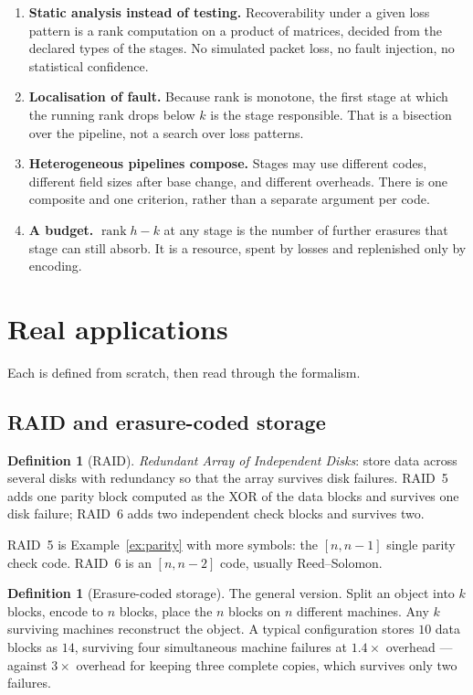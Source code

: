 \documentclass[11pt,a4paper]{article}
\theoremstyle{definition}
\newtheorem{definition}[theorem]{Definition}
\theoremstyle{remark}
\DeclareMathOperator{\rank}{rank}
\begin{document}
\begin{enumerate}[nosep]
  \item \textbf{Static analysis instead of testing.} Recoverability under a given loss
        pattern is a rank computation on a product of matrices, decided from the
        declared types of the stages. No simulated packet loss, no fault injection,
        no statistical confidence.
  \item \textbf{Localisation of fault.} Because rank is monotone, the first stage at
        which the running rank drops below $k$ is the stage responsible. That is a
        bisection over the pipeline, not a search over loss patterns.
  \item \textbf{Heterogeneous pipelines compose.} Stages may use different codes,
        different field sizes after base change, and different overheads. There is one
        composite and one criterion, rather than a separate argument per code.
  \item \textbf{A budget.} $\rank h - k$ at any stage is the number of further
        erasures that stage can still absorb. It is a resource, spent by losses and
        replenished only by encoding.
\end{enumerate}

\section{Real applications}

Each is defined from scratch, then read through the formalism.

\subsection{RAID and erasure-coded storage}

\begin{definition}[RAID]
\emph{Redundant Array of Independent Disks}: store data across several disks with
redundancy so that the array survives disk failures. RAID~5 adds one parity block
computed as the XOR of the data blocks and survives one disk failure; RAID~6 adds two
independent check blocks and survives two.
\end{definition}

RAID~5 is Example~\ref{ex:parity} with more symbols: the $[n, n-1]$ single parity
check code. RAID~6 is an $[n, n-2]$ code, usually Reed--Solomon.

\begin{definition}[Erasure-coded storage]
The general version. Split an object into $k$ blocks, encode to $n$ blocks, place the
$n$ blocks on $n$ different machines. Any $k$ surviving machines reconstruct the
object. A typical configuration stores $10$ data blocks as $14$, surviving four
simultaneous machine failures at $1.4\times$ overhead --- against $3\times$ overhead
for keeping three complete copies, which survives only two failures.
\end{definition}
\end{document}
